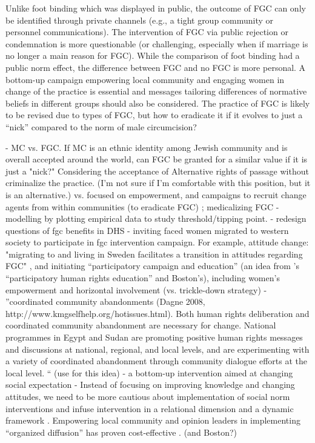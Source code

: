 \documentclass[12pt,]{article}
\begin{document}
Unlike foot binding which was displayed in public, the outcome of FGC can only be identified through private channels (e.g., a tight group community or personnel communications).  The intervention of FGC via public rejection or condemnation is more questionable (or challenging, especially when if marriage is no longer a main reason for FGC).  While the comparison of foot binding had a public norm effect, the difference between FGC and no FGC is more personal.  A bottom-up campaign empowering local community and engaging women in change of the practice is essential \cite{BergDeni13b} and messages tailoring differences of normative beliefs in different groups should also be considered.  The practice of FGC is likely to be revised due to types of FGC, but how to eradicate it if it evolves to just a “nick” compared to the norm of male circumcision?

- MC vs. FGC.  If MC is an ethnic identity among Jewish community and is overall accepted around the world, can FGC be granted for a similar value if it is just a "nick?"
Considering the acceptance of Alternative rights of passage \cite{GaluKama15} without criminalize the practice. (I'm not sure if I'm comfortable with this position, but it is an alternative.) vs. focused on empowerment, and campaigns to recruit change agents from within communities (to eradicate FGC) \cite{ShelHern13, Will18}; medicalizing FGC \cite{LeyeVanE19}
- modelling by plotting empirical data to study threshold/tipping point.
- redesign questions of fgc benefits in DHS
- inviting faced women migrated to western society to participate in fgc intervention campaign.  For example,  attitude change: "migrating to and living in Sweden facilitates a transition in attitudes regarding FGC" \cite{WahlJohn17}, and initiating “participatory campaign and education”  (an idea from \cite{MackLeJe08}’s “participatory human rights education” and Boston’s), including women’s empowerment and horizontal involvement (vs. trickle-down strategy)
- \cite{MackLeJe08}”coordinated community abandonments (Dagne 2008, http://www.kmgselfhelp.org/hotissues.html). Both human rights deliberation and coordinated community abandonment are necessary for change. National programmes in Egypt and Sudan are promoting positive human rights messages and discussions at national, regional, and local levels, and are experimenting with a variety of coordinated abandonment through community dialogue efforts at the local level. “ (use \cite{Dagn09, MackLeJe08} for this idea)
- a bottom-up intervention aimed at changing social expectation \cite{BiccMari15}
- Instead of focusing on improving knowledge and changing attitudes, we need to be more cautious about implementation of social norm interventions and infuse intervention in a relational dimension and a dynamic framework \cite{CislHeis18a, CislHeis18b, McCh15}.  Empowering local community and opinion leaders in implementing “organized diffusion” \cite{MackLeJe08}has proven cost-effective \cite{CislDenn19}. (and Boston?)
\end{document}
